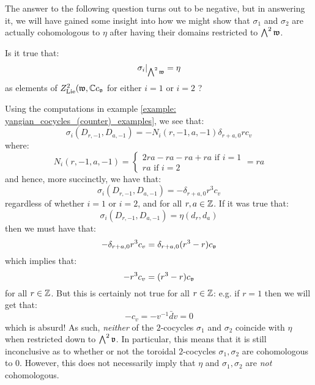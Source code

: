        The answer to the following question turns out to be negative, but in answering it, we will have gained some insight into how we might show that $\sigma_1$ and $\sigma_2$ are actually cohomologous to $\eta$ after having their domains restricted to $\bigwedge^2 \mathfrak{w}$.
        \begin{question}
            Is it true that:
                $$\sigma_i|_{ \bigwedge^2 \mathfrak{w} } = \eta$$
            as elements of $Z^2_{\mathrm{Lie}}(\mathfrak{w}, \mathbb{C} c_{\mathfrak{v}}$ for either $i = 1$ or $i = 2$ ?
        \end{question}
        Using the computations in example \ref{example: yangian_cocycles_(counter)_examples}, we see that:
            $$\sigma_i(D_{r, -1}, D_{a, -1}) = -N_i(r, -1, a, -1) \delta_{r + a, 0} r c_v$$
        where:
            $$
                N_i(r, -1, a, -1) =
                \begin{cases}
                    \text{$2 ra - ra - ra + ra$ if $i = 1$}
                    \\
                    \text{$ra$ if $i = 2$}
                \end{cases}
                = ra
            $$
        and hence, more succinctly, we have that:
            $$\sigma_i(D_{r, -1}, D_{a, -1}) = -\delta_{r + a, 0} r^3 c_v$$
        regardless of whether $i = 1$ or $i = 2$, and for all $r, a \in \mathbb{Z}$. If it was true that:
            $$\sigma_i(D_{r, -1}, D_{a, -1}) = \eta(d_r, d_a)$$
        then we must have that:
            $$-\delta_{r + a, 0} r^3 c_v = \delta_{r + a, 0} (r^3 - r) c_{\mathfrak{v}}$$
        which implies that:
            $$-r^3 c_v = (r^3 - r) c_{\mathfrak{v}}$$
        for all $r \in \mathbb{Z}$. But this is certainly not true for all $r \in \mathbb{Z}$: e.g. if $r = 1$ then we will get that:
            $$-c_v = -v^{-1} \bar{d}v = 0$$
        which is absurd! As such, \textit{neither} of the $2$-cocycles $\sigma_1$ and $\sigma_2$ coincide with $\eta$ when restricted down to $\bigwedge^2 \mathfrak{v}$. In particular, this means that it is still inconclusive as to whether or not the toroidal $2$-cocycles $\sigma_1, \sigma_2$ are cohomologous to $0$. However, this does not necessarily imply that $\eta$ and $\sigma_1, \sigma_2$ are \textit{not} cohomologous. 

